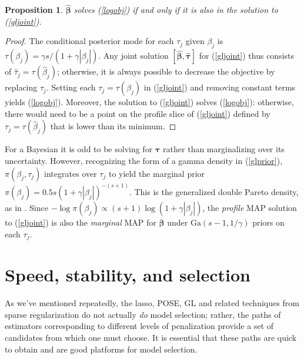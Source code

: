 \documentclass[12pt]{article}
\newtheorem{prop}{\sc Proposition}[section]
\newcommand{\bs}[1]{\boldsymbol{#1}}
\newcommand{\mr}[1]{\mathrm{#1}}
\begin{document}
\begin{prop}\label{penprop}
  $\bs{\hat\beta}$ solves (\ref{logobj}) if and only if it is also in the
  solution to (\ref{gljoint}).
\end{prop}
\begin{proof}
  The conditional posterior mode for each $\tau_j$ given $\beta_j$
  is $\tau(\beta_j) = \gamma s/(1 + \gamma|\beta_j|)$.  Any joint solution
  $[\bs{\hat\beta},\bs{\hat\tau}]$ for (\ref{gljoint}) thus
  consists of $\hat{\tau}_{j} = \tau(\hat\beta_{j})$;
  otherwise, it is always possible to decrease the objective by
  replacing $\hat\tau_{j}$. Setting each $\tau_j = 
  \tau(\beta_j)$ in (\ref{gljoint}) and removing constant terms yields
  (\ref{logobj}).  Moreover, the solution to (\ref{gljoint}) solves
  (\ref{logobj}): otherwise, there would need to be a point on the profile
  slice of (\ref{gljoint}) defined by $\tau_{j} =
  \tau(\hat\beta_{j})$ that is lower than its minimum.
\end{proof}

For a Bayesian it is odd to be solving for $\bs{\tau}$ rather than
marginalizing over its uncertainty.  However, recognizing the form of a gamma
density  in (\ref{glprior}), $\pi(\beta_j,\tau_j)$ integrates over $\tau_j$ to
yield the marginal prior $ \pi(\beta_j) = 0.5s\left( 1+
\gamma|\beta_j|\right)^{-(s+1)}$. This is the generalized double Pareto
density, as in  \citet{armagan_generalized_2013}. Since $-\log \pi(\beta_j)
\propto (s+1)\log(1 + \gamma|\beta_j|)$, the {\it profile} MAP solution to
(\ref{gljoint}) is also the {\it marginal} MAP for
$\bs{\beta}$ under $\mr{Ga}(s-1,1/\gamma)$ priors on each $\tau_j$.


\section{Speed, stability, and selection}
\label{sss}


As we've mentioned repeatedly, the lasso, POSE, GL and related techniques from
sparse regularization do not actually {\it do} model selection; rather, the
paths of estimators corresponding to different levels of penalization provide
a set of candidates from which one must choose. It is essential that these
paths are quick to obtain and are good platforms for model selection.
\end{document}
